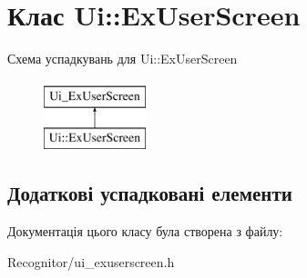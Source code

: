 \hypertarget{classUi_1_1ExUserScreen}{\section{Клас Ui\-:\-:Ex\-User\-Screen}
\label{classUi_1_1ExUserScreen}
}
Схема успадкувань для Ui\-:\-:Ex\-User\-Screen\begin{figure}[H]
\begin{center}
\leavevmode
\includegraphics[height=2.000000cm]{classUi_1_1ExUserScreen}
\end{center}
\end{figure}
\subsection*{Додаткові успадковані елементи}


Документація цього класу була створена з файлу\-:\begin{DoxyCompactItemize}
\item 
Recognitor/ui\-\_\-exuserscreen.\-h\end{DoxyCompactItemize}
